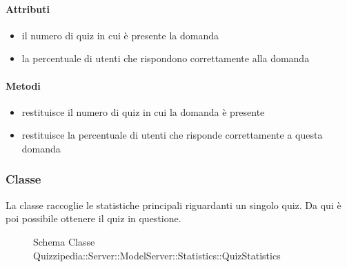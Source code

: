 \paragraph{Attributi}
\begin{itemize}
\item {}
\newline
il numero di quiz in cui è presente la domanda
\item {}
\newline
la percentuale di utenti che rispondono correttamente alla domanda
\end{itemize}
\paragraph{Metodi}
\begin{itemize}
\item {}
\newline
restituisce il numero di quiz in cui la domanda è presente
\newline
\item {}
\newline
restituisce la percentuale di utenti che risponde correttamente a questa domanda
\newline
\end{itemize}
\subsubsection{Classe }
La classe raccoglie le statistiche principali riguardanti un singolo quiz. Da qui è poi possibile ottenere il quiz in questione.
\begin{figure}[H]
\centering
\noindent{}
\caption[Schema Classe QuizStatistics]{Schema Classe Quizzipedia::Server::ModelServer::Statistics::QuizStatistics}
\end{figure}
